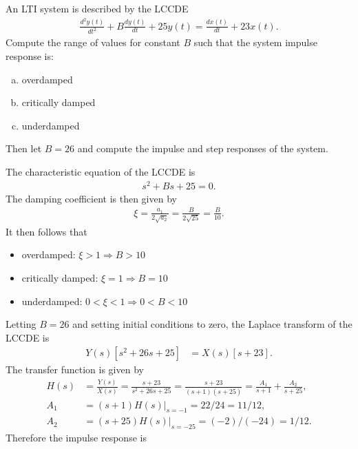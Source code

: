 \documentclass{report}
\begin{document}
\begin{example}
    An LTI system is described by the LCCDE 
    \begin{align*}
        \frac{d^2y(t)}{dt^2} + B\frac{dy(t)}{dt} + 25y(t) = \frac{dx(t)}{dt} + 23x(t).
    \end{align*}
    Compute the range of values for constant $B$ such that the system impulse response is:
    \begin{enumerate}[(a)]
        \item overdamped
        \item critically damped
        \item underdamped
    \end{enumerate}
    Then let $B=26$ and compute the impulse and step responses of the system.
\end{example}
\begin{solution}
    The characteristic equation of the LCCDE is 
    \begin{align*}
        s^2 + Bs + 25 = 0.
    \end{align*}
    The damping coefficient is then given by 
    \begin{align*}
        \xi = \frac{a_1}{2\sqrt{a_2}} = \frac{B}{2\sqrt{25}} = \frac{B}{10}.
    \end{align*}
    It then follows that
    \begin{itemize}
        \item overdamped: $\xi > 1 \Longrightarrow B > 10$
        \item critically damped: $\xi = 1 \Longrightarrow B = 10$
        \item underdamped: $0<\xi<1 \Longrightarrow 0<B<10$
    \end{itemize}
    Letting $B=26$ and setting initial conditions to zero, the Laplace transform of the LCCDE is
    \begin{align*}
        Y(s)[s^2+26s+25] &= X(s)[s+23].
    \end{align*}
    The transfer function is given by
    \begin{align*}
        H(s) &= \frac{Y(s)}{X(s)} = \frac{s+23}{s^2+26s+25} = \frac{s+23}{(s+1)(s+25)} = \frac{A_1}{s+1} + \frac{A_2}{s+25}, \\
        A_1 &= (s+1)H(s)\big|_{s=-1} = 22/24 = 11/12, \\
        A_2 &= (s+25)H(s)\big|_{s=-25} = (-2)/(-24) = 1/12.
    \end{align*}
    Therefore the impulse response is 
    \begin{align*}

\end{align*}
\end{solution}
\end{document}
